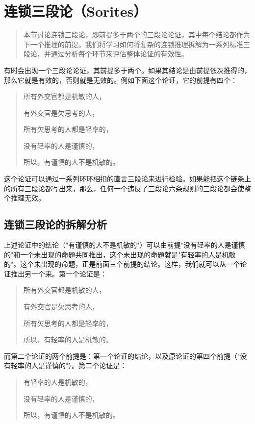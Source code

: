 \section{连锁三段论（Sorites）}

\begin{quotation}
本节讨论连锁三段论，即前提多于两个的三段论论证，其中每个结论都作为下一个推理的前提。我们将学习如何将复杂的连锁推理拆解为一系列标准三段论，并通过分析每个环节来评估整体论证的有效性。
\end{quotation}

有时会出现一个三段论论证，其前提多于两个。如果其结论是由前提依次推得的，那么它就是有效的，否则就是无效的。例如下面这个论证，它的前提有四个：

\begin{quote}
所有外交官都是机敏的人，

有外交官是欠思考的人，

所有欠思考的人都是轻率的，

没有轻率的人是谨慎的，

所以，有谨慎的人不是机敏的。
\end{quote}

这个论证可以通过一系列环环相扣的直言三段论来进行检验。如果能把这个链条上的所有三段论都写出来，那么，任何一个违反了三段论六条规则的三段论都会使整个推理无效。

\subsection{连锁三段论的拆解分析}

上述论证中的结论（"有谨慎的人不是机敏的"）可以由前提"没有轻率的人是谨慎的"和一个未出现的命题共同推出，这个未出现的命题就是"有轻率的人是机敏的"。这个未出现的命题，正是前面三个前提的结论。这样，我们就可以从一个论证推出另一个来。第一个论证是：

\begin{quote}
所有外交官都是机敏的人，

有外交官是欠思考的人，

所有欠思考的人都是轻率的，

所以，有轻率的人是机敏的。
\end{quote}

而第二个论证的两个前提是：第一个论证的结论，以及原论证的第四个前提（"没有轻率的人是谨慎的"）。第二个论证是：

\begin{quote}
有轻率的人是机敏的，

没有轻率的人是谨慎的，

所以，有谨慎的人不是机敏的。
\end{quote}

